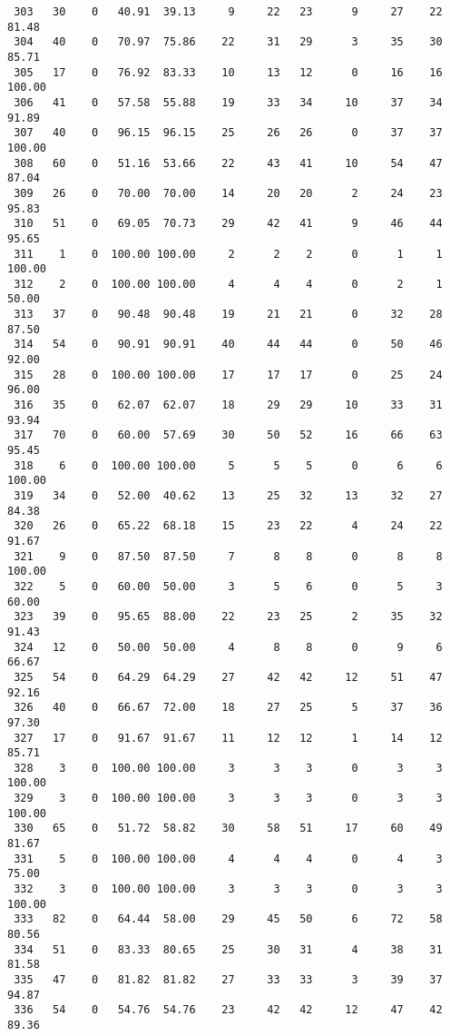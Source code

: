 \begin{verbatim}
 303   30    0   40.91  39.13     9     22   23      9     27    22    81.48
 304   40    0   70.97  75.86    22     31   29      3     35    30    85.71
 305   17    0   76.92  83.33    10     13   12      0     16    16   100.00
 306   41    0   57.58  55.88    19     33   34     10     37    34    91.89
 307   40    0   96.15  96.15    25     26   26      0     37    37   100.00
 308   60    0   51.16  53.66    22     43   41     10     54    47    87.04
 309   26    0   70.00  70.00    14     20   20      2     24    23    95.83
 310   51    0   69.05  70.73    29     42   41      9     46    44    95.65
 311    1    0  100.00 100.00     2      2    2      0      1     1   100.00
 312    2    0  100.00 100.00     4      4    4      0      2     1    50.00
 313   37    0   90.48  90.48    19     21   21      0     32    28    87.50
 314   54    0   90.91  90.91    40     44   44      0     50    46    92.00
 315   28    0  100.00 100.00    17     17   17      0     25    24    96.00
 316   35    0   62.07  62.07    18     29   29     10     33    31    93.94
 317   70    0   60.00  57.69    30     50   52     16     66    63    95.45
 318    6    0  100.00 100.00     5      5    5      0      6     6   100.00
 319   34    0   52.00  40.62    13     25   32     13     32    27    84.38
 320   26    0   65.22  68.18    15     23   22      4     24    22    91.67
 321    9    0   87.50  87.50     7      8    8      0      8     8   100.00
 322    5    0   60.00  50.00     3      5    6      0      5     3    60.00
 323   39    0   95.65  88.00    22     23   25      2     35    32    91.43
 324   12    0   50.00  50.00     4      8    8      0      9     6    66.67
 325   54    0   64.29  64.29    27     42   42     12     51    47    92.16
 326   40    0   66.67  72.00    18     27   25      5     37    36    97.30
 327   17    0   91.67  91.67    11     12   12      1     14    12    85.71
 328    3    0  100.00 100.00     3      3    3      0      3     3   100.00
 329    3    0  100.00 100.00     3      3    3      0      3     3   100.00
 330   65    0   51.72  58.82    30     58   51     17     60    49    81.67
 331    5    0  100.00 100.00     4      4    4      0      4     3    75.00
 332    3    0  100.00 100.00     3      3    3      0      3     3   100.00
 333   82    0   64.44  58.00    29     45   50      6     72    58    80.56
 334   51    0   83.33  80.65    25     30   31      4     38    31    81.58
 335   47    0   81.82  81.82    27     33   33      3     39    37    94.87
 336   54    0   54.76  54.76    23     42   42     12     47    42    89.36

\end{verbatim}
